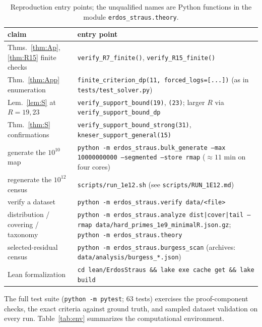 \documentclass[11pt]{article}
\theoremstyle{plain}
\theoremstyle{remark}
\theoremstyle{plain}
\numberwithin{equation}{section}
\begin{document}
\begin{table}[htbp]
\centering
\small
\begin{tabular}{>{\raggedright\arraybackslash}p{4.3cm}>{\raggedright\arraybackslash}p{8.7cm}}
\toprule
claim & entry point \\ \midrule
Thms.~\ref{thm:Ap}, \ref{thm:R15} finite checks &
\texttt{verify\_R7\_finite()}, \texttt{verify\_R15\_finite()} \\ \addlinespace
Thm.~\ref{thm:App} enumeration &
\texttt{finite\_criterion\_dp(11, forced\_logs=[...])} (as in
\texttt{tests/test\_solver.py}) \\ \addlinespace
Lem.~\ref{lem:S} at $R = 19, 23$ &
\texttt{verify\_support\_bound(19)}, \texttt{(23)}; larger $R$ via
\texttt{verify\_support\_bound\_dp} \\ \addlinespace
Thm.~\ref{thm:S} confirmations &
\texttt{verify\_support\_bound\_strong(31)},
\texttt{kneser\_support\_general(15)} \\ \addlinespace
generate the $10^{10}$ map &
\texttt{python -m erdos\_straus.bulk\_generate --max 10000000000
--segmented --store rmap} ($\approx 11$ min on four cores) \\ \addlinespace
regenerate the $10^{12}$ census &
\texttt{scripts/run\_1e12.sh} (see \texttt{scripts/RUN\_1E12.md}) \\ \addlinespace
verify a dataset &
\texttt{python -m erdos\_straus.verify data/<file>} \\ \addlinespace
distribution / covering / taxonomy &
\texttt{python -m erdos\_straus.analyze dist|cover|tail --rmap
data/hard\_primes\_1e9\_minimalR.json.gz};
\texttt{python -m erdos\_straus.theory} \\ \addlinespace
selected-residual census &
\texttt{python -m erdos\_straus.burgess\_scan} (archives:
\texttt{data/analysis/burgess\_*.json}) \\ \addlinespace
Lean formalization &
\texttt{cd lean/ErdosStraus \&\& lake exe cache get \&\& lake build} \\
\bottomrule
\end{tabular}
\caption{Reproduction entry points; the unqualified names are Python
functions in the module \texttt{erdos\_straus.theory}.}
\label{tab:repro}
\end{table}

The full test suite (\texttt{python -m pytest}; $63$ tests) exercises the
proof-component checks, the exact criteria against ground truth, and
sampled dataset validation on every run.
Table~\ref{tab:env} summarizes the computational environment.
\end{document}
